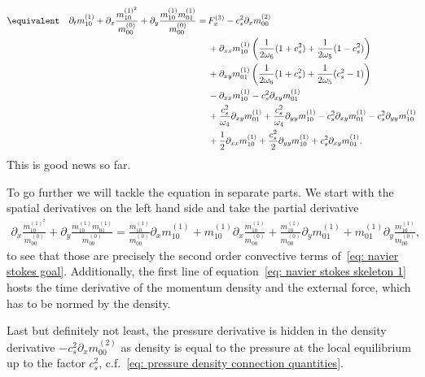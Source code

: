   \begin{align}
    \nonumber
    \equivalent\quad
  \partial_t m_{10}^{(1)}
  + \partial_x \frac{ m_{10}^{{(1)}^2} }{m_{00}^{(0)}}
  + \partial_y \frac{ m_{10}^{(1)}m_{01}^{(1)}}{m_{00}^{(0)}}
  =&\,
  F_x^{(3)}
  - c_s^2 \partial_x  m_{00}^{(2)}
  \\\nonumber &\,
  + \partial_{xx} m_{10}^{(1)} \left(\frac{1}{2\omega_6}(1+c_s^2)
  + \frac{1}{2\omega_5} (1 - c_s^2)\right)
  \\\nonumber &\,
  + \partial_{xy} m_{01}^{(1)} \left(\frac{1}{2\omega_6}(1+c_s^2)
  + \frac{1}{2\omega_5} (c_s^2 - 1)\right)
  \\\nonumber &\,
  - \partial_{xx} m_{10}^{(1)}
  - c_s^2\partial_{xy} m_{01}^{(1)}
  \\\nonumber &\,
  + \frac{c_s^2}{\omega_4}\partial_{xy} m_{01}^{(1)}
  + \frac{c_s^2}{\omega_4}\partial_{yy} m_{10}^{(1)}
  - c_s^2 \partial_{xy} m_{01}^{(1)}
  - c_s^2 \partial_{yy} m_{10}^{(1)}
  \\ &\,
  + \frac{1}{2}\partial_{xx} m_{10}^{(1)}
  + \frac{c_s^2}{2} \partial_{yy} m_{10}^{(1)} + c_s^2\partial_{xy} m_{01}^{(1)}
  .\label{eq: navier stokes skeleton 1}
\end{align}
This is good news so far.

To go further we will tackle the equation in separate parts.
We start with the spatial derivatives on the left hand side and take the partial derivative
\begin{align}
  \label{eq: convective parts}
  \partial_x \frac{ m_{10}^{{(1)}^2} }{m_{00}^{(0)}}
  + \partial_y \frac{ m_{10}^{(1)}m_{01}^{(1)}}{m_{00}^{(0)}}
  =
  \frac{ m_{10}^{{(1)}} }{m_{00}^{(0)}} \partial_x  m_{10}^{{(1)}}
  +  m_{10}^{{(1)}} \partial_x \frac{ m_{10}^{{(1)}} }{m_{00}^{(0)}}
  + \frac{ m_{10}^{(1)}}{m_{00}^{(0)}}\partial_y m_{01}^{(1)}
  + m_{01}^{(1)}\partial_y \frac{ m_{10}^{(1)}}{m_{00}^{(0)}},
\end{align}
to see that those are precisely the second order convective   terms of~\eqref{eq: navier stokes goal}.
Additionally, the first line of equation~\eqref{eq: navier stokes skeleton 1} hosts the time derivative of the momentum density and the external force, which has to be normed by the density.

Last but definitely not least, the pressure derivative is hidden in the density derivative $-c_s^2 \partial_x  m_{00}^{(2)}$ as density is equal to the pressure at the local equilibrium up to the factor $c_s^2$, c.f.~\eqref{eq: pressure density connection quantities}.

